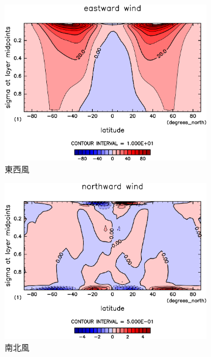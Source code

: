 \documentclass[body]{subfiles}
\begin{document}
\begin{figure}[t]
	\centering
	\begin{subfigure}{.4\textwidth}
		\centering
		\includegraphics[width=\columnwidth]{S1500-nc/U,time=3650:4015-crop-rotate.pdf}
		\caption{東西風\hmu*{[m/s]}}\label{S1500nc東西風}
	\end{subfigure}
	\begin{subfigure}{.4\textwidth}
		\centering
		\includegraphics[width=\columnwidth]{S1500-nc/V,time=3650:4015-crop-rotate.pdf}
		\caption{南北風\hmu*{[m/s]}}\label{S1500nc南北風}
	\end{subfigure}
	\begin{subfigure}{.4\textwidth}

\end{subfigure}
\end{figure}
\end{document}
